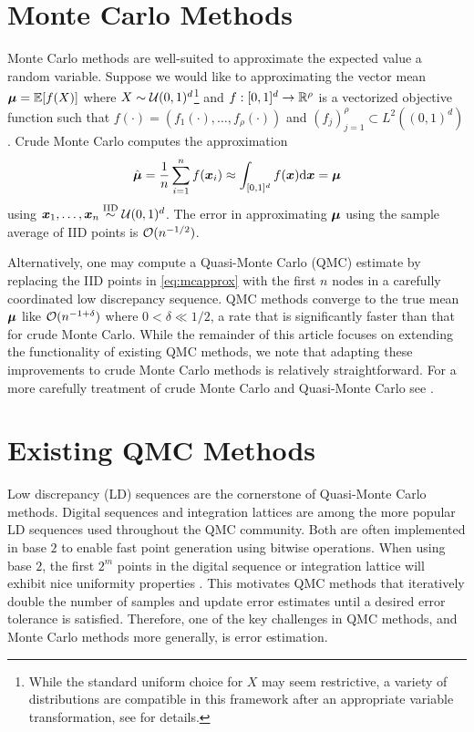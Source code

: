 \documentclass{article}[12pt]
\begin{document}
\section{Monte Carlo Methods}

Monte Carlo methods are well-suited to approximate the expected value a random variable. Suppose we would like to approximating the vector mean $\boldsymbol{\mu} = \mathbb{E}[f(X)]$ where $X\sim\mathcal{U}(0,1)^d$\footnote{While the standard uniform choice for $X$ may seem restrictive, a variety of distributions are compatible in this framework after an appropriate variable transformation, see  for details.} and  $f: [0,1]^d \to \mathbb{R}^\rho$ is a vectorized objective function such that $f(\cdot)=(f_1(\cdot),\dots,f_\rho(\cdot))$ and  $(f_j)_{j=1}^\rho \subset L^2((0,1)^d)$.  Crude Monte Carlo computes the approximation 
\begin{equation}
    \label{eq:mcapprox}
    \hat{\boldsymbol{\mu}} = \frac{1}{n}\sum_{i=1}^n f(\boldsymbol{x}_i) \approx \int_{[0,1]^d}f(\boldsymbol{x})\mathrm{d}\boldsymbol{x} = \boldsymbol{\mu}
\end{equation}
using $\boldsymbol{x}_1,\dots,\boldsymbol{x}_n \overset{\text{IID}}{\sim} \mathcal{U}(0,1)^d$. The error in approximating $\boldsymbol{\mu}$ using the sample average of IID points is  $\mathcal{O}(n^{-1/2})$. 

Alternatively, one may compute a Quasi-Monte Carlo (QMC) estimate by replacing the IID points in \eqref{eq:mcapprox} with the first $n$ nodes in a carefully coordinated low discrepancy sequence. QMC methods converge to the true mean $\boldsymbol{\mu}$ like $\mathcal{O}(n^{-1+\delta})$ where $0 < \delta \ll 1/2$, a rate that is significantly faster than that for crude Monte Carlo. While the remainder of this article focuses on extending the functionality of existing QMC methods, we note that adapting these improvements to crude Monte Carlo methods is relatively straightforward. For a more carefully treatment of crude Monte Carlo and Quasi-Monte Carlo see . 

\section{Existing QMC Methods}

Low discrepancy (LD) sequences are the cornerstone of Quasi-Monte Carlo methods. Digital sequences and integration lattices are among the more popular LD sequences used throughout the QMC community. Both are often implemented in base $2$ to enable fast point generation using bitwise operations. When using base $2$, the first $2^m$ points in the digital sequence or integration lattice will exhibit nice uniformity properties . This motivates QMC methods that iteratively double the number of samples and update error estimates until a desired error tolerance is satisfied. Therefore, one of the key challenges in QMC methods, and Monte Carlo methods more generally, is error estimation.
\end{document}
